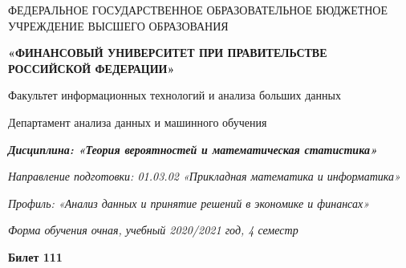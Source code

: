 \documentclass[a4paper,14pt]{article}
\begin{document}
\begin{center}
ФЕДЕРАЛЬНОЕ ГОСУДАРСТВЕННОЕ ОБРАЗОВАТЕЛЬНОЕ БЮДЖЕТНОЕ УЧРЕЖДЕНИЕ ВЫСШЕГО ОБРАЗОВАНИЯ

    \textbf{«ФИНАНСОВЫЙ УНИВЕРСИТЕТ ПРИ ПРАВИТЕЛЬСТВЕ РОССИЙСКОЙ ФЕДЕРАЦИИ»}

Факультет информационных технологий и анализа больших данных

Департамент анализа данных и машинного обучения

\textit{
	\textbf{Дисциплина: «Теория вероятностей и математическая статистика»}}

\textit{Направление подготовки: 01.03.02 «Прикладная математика и информатика»}

\textit{Профиль: «Анализ данных и принятие решений в экономике и финансах»}

\textit{Форма обучения очная, учебный 2020/2021 год, 4 семестр}

\textbf{Билет 111}

\end{center}
\end{document}
